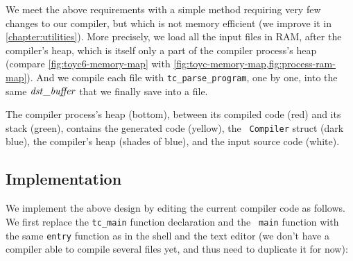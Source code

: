 We meet the above requirements with a simple method requiring very few changes
to our compiler, but which is not memory efficient (we improve it in
\cref{chapter:utilities}). More precisely, we load all the input files in RAM,
after the compiler's heap, which is itself only a part of the compiler
process's heap (compare \cref{fig:toyc6-memory-map} with
\cref{fig:toyc-memory-map,fig:process-ram-map}). And we compile each file with
{\tt tc\_parse\_program}, one by one, into the same $\it{dst\_buffer}$ that we
finally save into a file.

\begin{Figure}
  

  \caption{The compiler process's heap (bottom), between its compiled code
  (red) and its stack (green), contains the generated code (yellow), the {\tt
  Compiler} struct (dark blue), the compiler's heap (shades of blue), and the
  input source code (white).}\label{fig:toyc6-memory-map}
\end{Figure}

\subsection{Implementation}\label{subsection:toyc-process}

We implement the above design by editing the current compiler code as
follows. We first replace the {\tt tc\_main} function declaration and the {\tt
main} function with the same {\tt entry} function as in the shell and the text
editor (we don't have a compiler able to compile several files yet, and thus
need to duplicate it for now):



